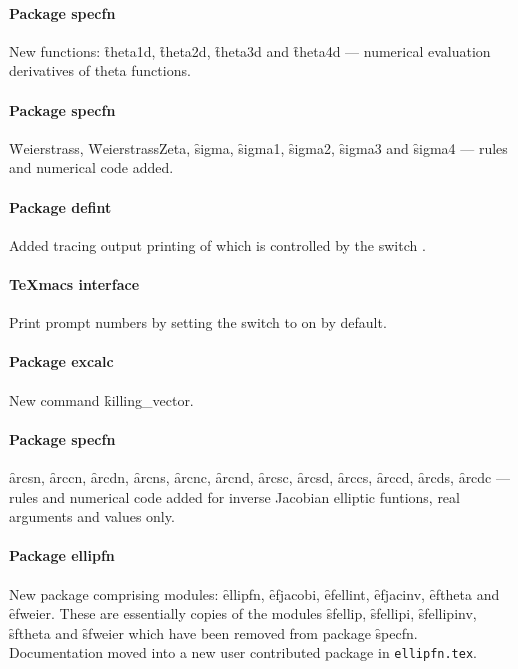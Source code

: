 \paragraph{Package specfn}

New functions: \f{theta1d}, \f{theta2d}, \f{theta3d} and \f{theta4d}
--- numerical evaluation derivatives of theta functions.

\paragraph{Package specfn}

\f{Weierstrass}, \f{WeierstrassZeta}, \f{sigma}, \f{sigma1}, \f{sigma2},
\f{sigma3} and \f{sigma4}  --- rules and numerical code added.

\paragraph{Package defint}

Added tracing output printing of which is controlled by the switch .

\paragraph{TeXmacs interface}

Print prompt numbers by setting the switch  to on by default.

\paragraph{Package excalc}

New command \f{killing\_vector}.

\paragraph{Package specfn}

\f{arcsn}, \f{arccn}, \f{arcdn}, \f{arcns}, \f{arcnc}, \f{arcnd},
\f{arcsc}, \f{arcsd}, \f{arccs}, \f{arccd}, \f{arcds}, \f{arcdc}
--- rules and numerical code added for inverse Jacobian elliptic funtions,
real arguments and values only.

\paragraph{Package ellipfn}

New package comprising modules: \f{ellipfn}, \f{efjacobi}, \f{efellint},
\f{efjacinv}, \f{eftheta} and \f{efweier}.
These are essentially copies of the modules \f{sfellip}, \f{sfellipi},
\f{sfellipinv}, \f{sftheta} and \f{sfweier} which have been removed from
package \f{specfn}.
Documentation moved into a new user contributed package in \texttt{ellipfn.tex}.
